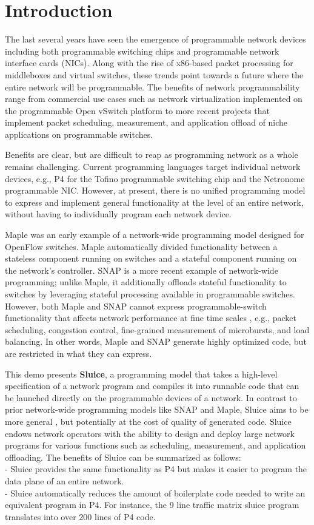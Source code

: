 \section{Introduction}
The last several years have seen the emergence of programmable network devices
including both programmable switching chips and programmable network interface
cards (NICs). Along with the rise of x86-based packet processing for
middleboxes and virtual switches, these trends point towards a future where the
entire network will be programmable. The benefits of network programmability
range from commercial use cases such as network virtualization implemented on
the programmable Open vSwitch platform to more recent projects that implement
packet scheduling, measurement, and application offload of niche applications
on programmable switches.

Benefits are clear, but are difficult to reap as
programming network as a whole remains challenging. Current programming languages target individual
network devices, e.g., P4 for the Tofino programmable switching chip and the
Netronome programmable NIC. However, at present, there is no unified
programming model to express and implement general functionality at the level
of an entire network, without having to individually program each network
device.

Maple was an early example of a network-wide programming model designed
for OpenFlow switches. Maple automatically divided functionality between a
stateless component running on switches and a stateful component running on the
network's controller. SNAP is a more recent example of network-wide
programming; unlike Maple, it additionally offloads stateful functionality to
switches by leveraging stateful processing available in programmable switches. However, both Maple
and SNAP cannot express programmable-switch functionality that affects network
performance at fine time scales , e.g.,
packet scheduling, congestion control, fine-grained measurement of microbursts,
and load balancing. In other words, Maple and SNAP generate highly optimized
code, but are restricted in what they can express.

This demo presents \textbf{Sluice}, a programming model that takes a high-level
specification of a network program and compiles it into runnable code that can
be launched directly on the programmable devices of a network. In contrast to
prior network-wide programming models like SNAP and Maple, Sluice aims to be
more general , but potentially at the cost of quality of generated code.
Sluice endows network operators with the ability to design and deploy large
network programs for various functions such as scheduling, measurement, and
application offloading.  The benefits of Sluice can be summarized as follows:\\
\indent - Sluice provides the same functionality as P4 but makes it easier to
program the data plane of an entire network. \\
\indent - Sluice automatically reduces the amount of boilerplate code needed to
write an equivalent program in P4. For instance, the 9 line traffic matrix
sluice program translates into over 200 lines of P4 code.

